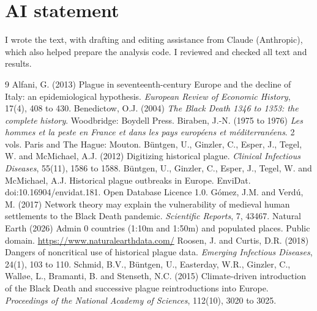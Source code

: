 \documentclass[11pt,a4paper]{article}
\begin{document}
\section*{AI statement}
I wrote the text, with drafting and editing assistance from Claude (Anthropic), which also helped prepare the analysis code. I reviewed and checked all text and results.

\begin{thebibliography}{9}
 Alfani, G. (2013) Plague in seventeenth-century Europe and the decline of Italy: an epidemiological hypothesis. \emph{European Review of Economic History}, 17(4), 408 to 430.
 Benedictow, O.J. (2004) \emph{The Black Death 1346 to 1353: the complete history}. Woodbridge: Boydell Press.
 Biraben, J.-N. (1975 to 1976) \emph{Les hommes et la peste en France et dans les pays europ\'eens et m\'editerran\'eens}. 2 vols. Paris and The Hague: Mouton.
 B\"untgen, U., Ginzler, C., Esper, J., Tegel, W. and McMichael, A.J. (2012) Digitizing historical plague. \emph{Clinical Infectious Diseases}, 55(11), 1586 to 1588.
 B\"untgen, U., Ginzler, C., Esper, J., Tegel, W. and McMichael, A.J. Historical plague outbreaks in Europe. EnviDat. doi:10.16904/envidat.181. Open Database Licence 1.0.
 G\'omez, J.M. and Verd\'u, M. (2017) Network theory may explain the vulnerability of medieval human settlements to the Black Death pandemic. \emph{Scientific Reports}, 7, 43467.
 Natural Earth (2026) Admin 0 countries (1:10m and 1:50m) and populated places. Public domain. \url{https://www.naturalearthdata.com/}
 Roosen, J. and Curtis, D.R. (2018) Dangers of noncritical use of historical plague data. \emph{Emerging Infectious Diseases}, 24(1), 103 to 110.
 Schmid, B.V., B\"untgen, U., Easterday, W.R., Ginzler, C., Walløe, L., Bramanti, B. and Stenseth, N.C. (2015) Climate-driven introduction of the Black Death and successive plague reintroductions into Europe. \emph{Proceedings of the National Academy of Sciences}, 112(10), 3020 to 3025.
\end{thebibliography}
\end{document}
